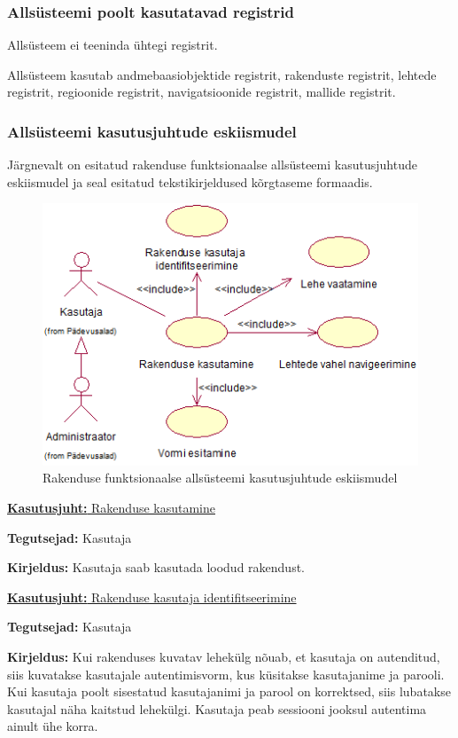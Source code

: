 \documentclass[a4paper,12pt]{article} %
\begin{document}
\subsubsection{Allsüsteemi poolt kasutatavad registrid}
Allsüsteem ei teeninda ühtegi registrit.\par
Allsüsteem kasutab andmebaasiobjektide registrit, rakenduste registrit, lehtede registrit, regioonide registrit, navigatsioonide registrit, mallide registrit.
\subsubsection{Allsüsteemi kasutusjuhtude eskiismudel}
Järgnevalt on esitatud rakenduse funktsionaalse allsüsteemi kasutusjuhtude eskiismudel ja seal esitatud tekstikirjeldused kõrgtaseme formaadis.
\begin{figure}[H]
\begin{center}
\includegraphics[bb=0 0 432 301,scale=1]{./diagrams/application-subsystem-use-case-digram.png}
\caption{Rakenduse funktsionaalse allsüsteemi kasutusjuhtude eskiismudel}
\end{center}
\end{figure}

\underline{\textbf{Kasutusjuht:} Rakenduse kasutamine}
\par
\textbf{Tegutsejad:} Kasutaja
\par
\textbf{Kirjeldus:} Kasutaja saab kasutada loodud rakendust.
\par

\underline{\textbf{Kasutusjuht:} Rakenduse kasutaja identifitseerimine}
\par
\textbf{Tegutsejad:} Kasutaja
\par
\textbf{Kirjeldus:} Kui rakenduses kuvatav lehekülg nõuab, et kasutaja on autenditud, siis kuvatakse kasutajale autentimisvorm, kus küsitakse kasutajanime ja parooli. Kui kasutaja poolt sisestatud kasutajanimi ja parool on korrektsed, siis lubatakse kasutajal näha kaitstud lehekülgi. Kasutaja peab sessiooni jooksul autentima ainult ühe korra.
\par
\end{document}
